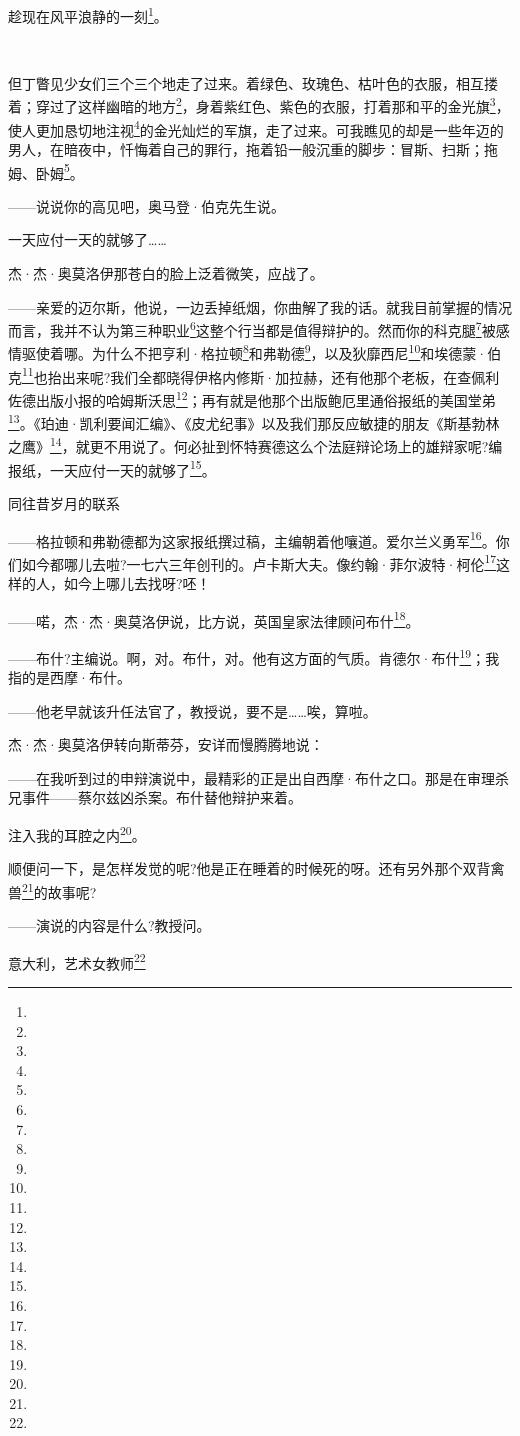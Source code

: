\par 趁现在风平浪静的一刻\footnote{}。
\par  
\par 但丁瞥见少女们三个三个地走了过来。着绿色、玫瑰色、枯叶色的衣服，相互搂着；穿过了这样幽暗的地方\footnote{}，身着紫红色、紫色的衣服，打着那和平的金光旗\footnote{}，使人更加恳切地注视\footnote{}的金光灿烂的军旗，走了过来。可我瞧见的却是一些年迈的男人，在暗夜中，忏悔着自己的罪行，拖着铅一般沉重的脚步：冒斯、扫斯；拖姆、卧姆\footnote{}。
\par ——说说你的高见吧，奥马登·伯克先生说。
\par 一天应付一天的就够了……
\par 杰·杰·奥莫洛伊那苍白的脸上泛着微笑，应战了。
\par ——亲爱的迈尔斯，他说，一边丢掉纸烟，你曲解了我的话。就我目前掌握的情况而言，我并不认为第三种职业\footnote{}这整个行当都是值得辩护的。然而你的科克腿\footnote{}被感情驱使着哪。为什么不把亨利·格拉顿\footnote{}和弗勒德\footnote{}，以及狄靡西尼\footnote{}和埃德蒙·伯克\footnote{}也抬出来呢?我们全都晓得伊格内修斯·加拉赫，还有他那个老板，在查佩利佐德出版小报的哈姆斯沃思\footnote{}；再有就是他那个出版鲍厄里通俗报纸的美国堂弟\footnote{}。《珀迪·凯利要闻汇编》、《皮尤纪事》以及我们那反应敏捷的朋友《斯基勃林之鹰》\footnote{}，就更不用说了。何必扯到怀特赛德这么个法庭辩论场上的雄辩家呢?编报纸，一天应付一天的就够了\footnote{}。
\par 同往昔岁月的联系
\par ——格拉顿和弗勒德都为这家报纸撰过稿，主编朝着他嚷道。爱尔兰义勇军\footnote{}。你们如今都哪儿去啦?一七六三年创刊的。卢卡斯大夫。像约翰·菲尔波特·柯伦\footnote{}这样的人，如今上哪儿去找呀?呸！
\par ——喏，杰·杰·奥莫洛伊说，比方说，英国皇家法律顾问布什\footnote{}。
\par ——布什?主编说。啊，对。布什，对。他有这方面的气质。肯德尔·布什\footnote{}；我指的是西摩·布什。
\par ——他老早就该升任法官了，教授说，要不是……唉，算啦。
\par 杰·杰·奥莫洛伊转向斯蒂芬，安详而慢腾腾地说：
\par ——在我听到过的申辩演说中，最精彩的正是出自西摩·布什之口。那是在审理杀兄事件——蔡尔兹凶杀案。布什替他辩护来着。
\par 注入我的耳腔之内\footnote{}。
\par 顺便问一下，是怎样发觉的呢?他是正在睡着的时候死的呀。还有另外那个双背禽兽\footnote{}的故事呢?
\par ——演说的内容是什么?教授问。
\par 意大利，艺术女教师\footnote{}
